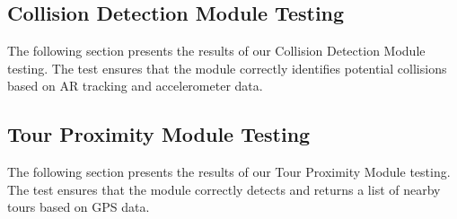 \documentclass[12pt, titlepage]{article}
\begin{document}
\subsection{Collision Detection Module Testing}

The following section presents the results of our Collision Detection Module testing. The test ensures that the module correctly identifies potential collisions based on AR tracking and accelerometer data.

\begin{table}[H]
  \caption{\bf Collision Detection Module Unit Test Results}
  \label{table:Unit-Collision}
\end{table}

\subsection{Tour Proximity Module Testing}

The following section presents the results of our Tour Proximity Module testing. The test ensures that the module correctly detects and returns a list of nearby tours based on GPS data.

\begin{table}[H]
  \caption{\bf Tour Proximity Module Unit Test Results}
  \label{table:Unit-TourProximity}
\end{table}
\end{document}

